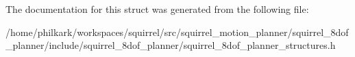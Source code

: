 The documentation for this struct was generated from the following file\-:\begin{DoxyCompactItemize}
\item 
/home/philkark/workspaces/squirrel/src/squirrel\-\_\-motion\-\_\-planner/squirrel\-\_\-8dof\-\_\-planner/include/squirrel\-\_\-8dof\-\_\-planner/squirrel\-\_\-8dof\-\_\-planner\-\_\-structures.\-h\end{DoxyCompactItemize}
